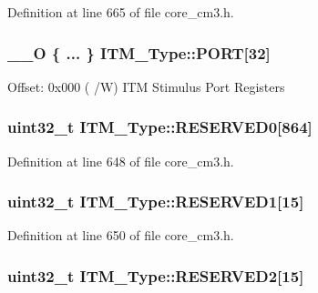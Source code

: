 Definition at line 665 of file core\+\_\+cm3.\+h.

\subsubsection[{\texorpdfstring{P\+O\+RT}{PORT}}]{\setlength{\rightskip}{0pt plus 5cm}\+\_\+\+\_\+O \{ ... \}    I\+T\+M\+\_\+\+Type\+::\+P\+O\+RT\mbox{[}32\mbox{]}}\hypertarget{structITM__Type_afe056e8c8f8c5519d9b47611fa3a4c46}{}\label{structITM__Type_afe056e8c8f8c5519d9b47611fa3a4c46}
Offset\+: 0x000 ( /W) I\+TM Stimulus Port Registers 
\subsubsection[{\texorpdfstring{R\+E\+S\+E\+R\+V\+E\+D0}{RESERVED0}}]{\setlength{\rightskip}{0pt plus 5cm}uint32\+\_\+t I\+T\+M\+\_\+\+Type\+::\+R\+E\+S\+E\+R\+V\+E\+D0\mbox{[}864\mbox{]}}\hypertarget{structITM__Type_a2c5ae30385b5f370d023468ea9914c0e}{}\label{structITM__Type_a2c5ae30385b5f370d023468ea9914c0e}


Definition at line 648 of file core\+\_\+cm3.\+h.

\subsubsection[{\texorpdfstring{R\+E\+S\+E\+R\+V\+E\+D1}{RESERVED1}}]{\setlength{\rightskip}{0pt plus 5cm}uint32\+\_\+t I\+T\+M\+\_\+\+Type\+::\+R\+E\+S\+E\+R\+V\+E\+D1\mbox{[}15\mbox{]}}\hypertarget{structITM__Type_afffce5b93bbfedbaee85357d0b07ebce}{}\label{structITM__Type_afffce5b93bbfedbaee85357d0b07ebce}


Definition at line 650 of file core\+\_\+cm3.\+h.

\subsubsection[{\texorpdfstring{R\+E\+S\+E\+R\+V\+E\+D2}{RESERVED2}}]{\setlength{\rightskip}{0pt plus 5cm}uint32\+\_\+t I\+T\+M\+\_\+\+Type\+::\+R\+E\+S\+E\+R\+V\+E\+D2\mbox{[}15\mbox{]}}\hypertarget{structITM__Type_af56b2f07bc6b42cd3e4d17e1b27cff7b}{}\label{structITM__Type_af56b2f07bc6b42cd3e4d17e1b27cff7b}



